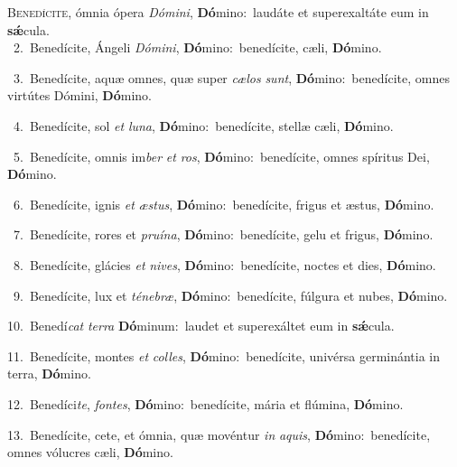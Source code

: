 \lettrine{\initial\textcolor{\initialcolor}{B}}{enedícite,} ómnia ópera \textit{Dó}\-\textit{mi}\textit{ni}, \textbf{Dó}\-mino:~\star laudáte et superexaltáte eum in \textbf{sǽ}\-cula.\\
{\numbfont\textcolor{\numbcolor}{~2.}}~Benedícite, Ángeli \textit{Dó}\-\textit{mi}\textit{ni}, \textbf{Dó}\-mino:~\star benedícite, cæli, \textbf{Dó}\-mino.\par
{\numbfont\textcolor{\numbcolor}{~3.}}~Benedícite, aquæ omnes, quæ super \textit{cæ}\-\textit{los} \textit{sunt}\-, \textbf{Dó}\-mino:~\star benedícite, omnes virtútes Dómini, \textbf{Dó}\-mino.\par
{\numbfont\textcolor{\numbcolor}{~4.}}~Benedícite, sol \textit{et} \textit{lu}\-\textit{na}, \textbf{Dó}\-mino:~\star benedícite, stellæ cæli, \textbf{Dó}\-mino.\par
{\numbfont\textcolor{\numbcolor}{~5.}}~Benedícite, omnis im\textit{ber} \textit{et} \textit{ros}\-, \textbf{Dó}\-mino:~\star benedícite, omnes spíritus Dei, \textbf{Dó}\-mino.\par
{\numbfont\textcolor{\numbcolor}{~6.}}~Benedícite, ignis \textit{et} \textit{æs}\-\textit{tus}, \textbf{Dó}\-mino:~\star benedícite, frigus et æstus, \textbf{Dó}\-mino.\par
{\numbfont\textcolor{\numbcolor}{~7.}}~Benedícite, rores et \textit{pru}\-\textit{í}\textit{na}, \textbf{Dó}\-mino:~\star benedícite, gelu et frigus, \textbf{Dó}\-mino.\par
{\numbfont\textcolor{\numbcolor}{~8.}}~Benedícite, glácies \textit{et} \textit{ni}\-\textit{ves}, \textbf{Dó}\-mino:~\star benedícite, noctes et dies, \textbf{Dó}\-mino.\par
{\numbfont\textcolor{\numbcolor}{~9.}}~Benedícite, lux et \textit{té}\-\textit{ne}\textit{bræ}, \textbf{Dó}\-mino:~\star benedícite, fúlgura et nubes, \textbf{Dó}\-mino.\par
{\numbfont\textcolor{\numbcolor}{10.}}~Benedí\textit{cat} \textit{ter}\-\textit{ra} \textbf{Dó}\-minum:~\star laudet et superexáltet eum in \textbf{sǽ}\-cula.\par
{\numbfont\textcolor{\numbcolor}{11.}}~Benedícite, montes \textit{et} \textit{col}\-\textit{les}, \textbf{Dó}\-mino:~\star benedícite, univérsa germinántia in terra, \textbf{Dó}\-mino.\par
{\numbfont\textcolor{\numbcolor}{12.}}~Benedíci\-\textit{te}\-, \textit{fon}\-\textit{tes}, \textbf{Dó}\-mino:~\star benedícite, mária et flúmina, \textbf{Dó}\-mino.\par
{\numbfont\textcolor{\numbcolor}{13.}}~Benedícite, cete, et ómnia, quæ movéntur \textit{in} \textit{a}\-\textit{quis}, \textbf{Dó}\-mino:~\star benedícite, omnes vólucres cæli, \textbf{Dó}\-mino.\par
